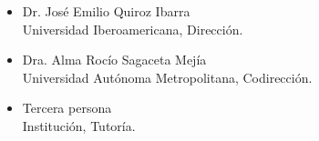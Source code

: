 \begin{itemize}
	\item Dr. José Emilio Quiroz Ibarra\\
	Universidad Iberoamericana, Dirección.
	\item Dra. Alma Rocío Sagaceta Mejía\\
	Universidad Autónoma Metropolitana, Codirección.
	\item Tercera persona\\
	Institución, Tutoría.
\end{itemize}